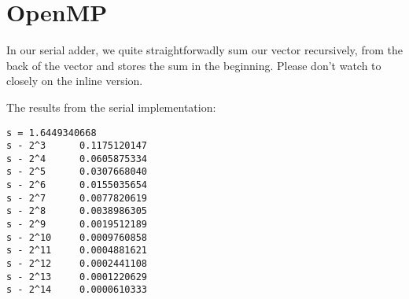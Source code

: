 \documentclass{article}
\begin{document}
\section{OpenMP}
In our serial adder, we quite straightforwadly sum our vector recursively, from the back of the vector and stores the sum in the beginning. Please don't watch to closely on the inline version.

The results from the serial implementation:
\begin{verbatim}
s = 1.6449340668
s - 2^3 	 0.1175120147
s - 2^4 	 0.0605875334
s - 2^5 	 0.0307668040
s - 2^6 	 0.0155035654
s - 2^7 	 0.0077820619
s - 2^8 	 0.0038986305
s - 2^9 	 0.0019512189
s - 2^10 	 0.0009760858
s - 2^11 	 0.0004881621
s - 2^12 	 0.0002441108
s - 2^13 	 0.0001220629
s - 2^14 	 0.0000610333
\end{verbatim}






\end{document}
